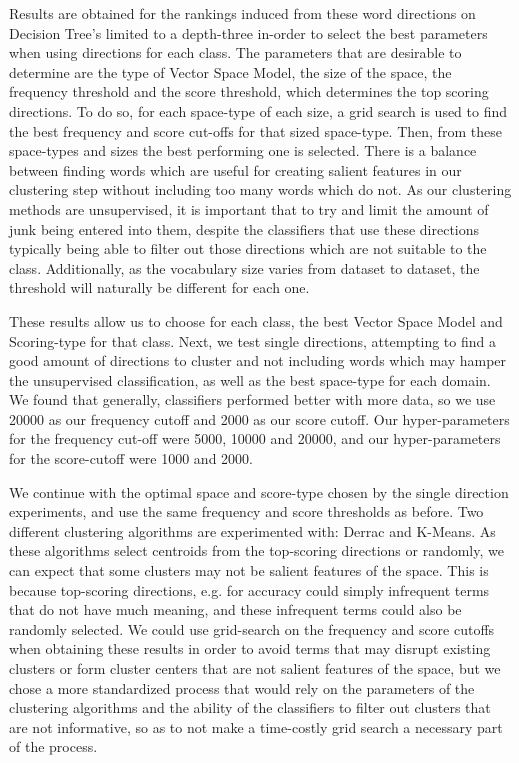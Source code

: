 Results are obtained for the rankings induced from these word directions on Decision Tree's limited to a depth-three in-order to select the best parameters when using directions for each class. The parameters that are desirable to determine are the type of Vector Space Model, the size of the space, the frequency threshold and the score threshold, which determines the top scoring directions. To do so, for each space-type of each size, a grid search is used to find the best frequency and score cut-offs for that sized space-type. Then, from these space-types and sizes the best performing one is selected. There is a balance between finding words which are useful for creating salient features in our clustering step without including too many words which do not. As our clustering methods are unsupervised, it is important that to try and limit the amount of junk being entered into them, despite the classifiers that use these directions typically being able to filter out those directions which are not suitable to the class. Additionally, as the vocabulary size varies from dataset to dataset, the threshold will naturally be different for each one. 

These results allow us to choose for each class, the best Vector Space Model and Scoring-type for that class.
Next, we test single directions, attempting to find a good amount of directions to cluster and not including words which may hamper the unsupervised classification, as well as the best space-type for each domain. We found that generally,  classifiers performed better with more data, so we use 20000 as our frequency cutoff and 2000 as our score cutoff. Our hyper-parameters for the frequency cut-off were 5000, 10000 and 20000, and our hyper-parameters for the score-cutoff were 1000 and 2000.

We continue with the optimal space and score-type chosen by the single direction experiments, and use the same frequency and score thresholds as before. Two different clustering algorithms are experimented with: Derrac and K-Means. As these algorithms select centroids from the top-scoring directions or randomly, we can expect that some clusters may not be salient features of the space. This is because top-scoring directions, e.g. for accuracy could simply infrequent terms that do not have much meaning, and these infrequent terms could also be randomly selected. We could use grid-search on the frequency and score cutoffs when obtaining these results in order to avoid terms that may disrupt existing clusters or form cluster centers that are not salient features of the space, but we chose a more standardized process that would rely on the parameters of the clustering algorithms and the ability of the classifiers to filter out clusters that are not informative, so as to not make a time-costly grid search a necessary part of the process.



